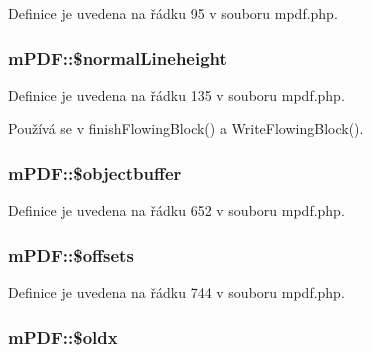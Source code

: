 Definice je uvedena na řádku 95 v souboru mpdf.\-php.

\hypertarget{classm_p_d_f_a23181d6d946a56cfdafaac7a604d52f2}{
\subsubsection[{\$normal\-Lineheight}]{\setlength{\rightskip}{0pt plus 5cm}m\-P\-D\-F\-::\$normal\-Lineheight}}\label{classm_p_d_f_a23181d6d946a56cfdafaac7a604d52f2}


Definice je uvedena na řádku 135 v souboru mpdf.\-php.



Používá se v finish\-Flowing\-Block() a Write\-Flowing\-Block().

\hypertarget{classm_p_d_f_a104049f281f613487a8263a45a1a0922}{
\subsubsection[{\$objectbuffer}]{\setlength{\rightskip}{0pt plus 5cm}m\-P\-D\-F\-::\$objectbuffer}}\label{classm_p_d_f_a104049f281f613487a8263a45a1a0922}


Definice je uvedena na řádku 652 v souboru mpdf.\-php.

\hypertarget{classm_p_d_f_adf1731e55063c789e9e388f917b11986}{
\subsubsection[{\$offsets}]{\setlength{\rightskip}{0pt plus 5cm}m\-P\-D\-F\-::\$offsets}}\label{classm_p_d_f_adf1731e55063c789e9e388f917b11986}


Definice je uvedena na řádku 744 v souboru mpdf.\-php.

\hypertarget{classm_p_d_f_a7db24b80bec847328647f7a0f8a62e7c}{
\subsubsection[{\$oldx}]{\setlength{\rightskip}{0pt plus 5cm}m\-P\-D\-F\-::\$oldx}}\label{classm_p_d_f_a7db24b80bec847328647f7a0f8a62e7c}


